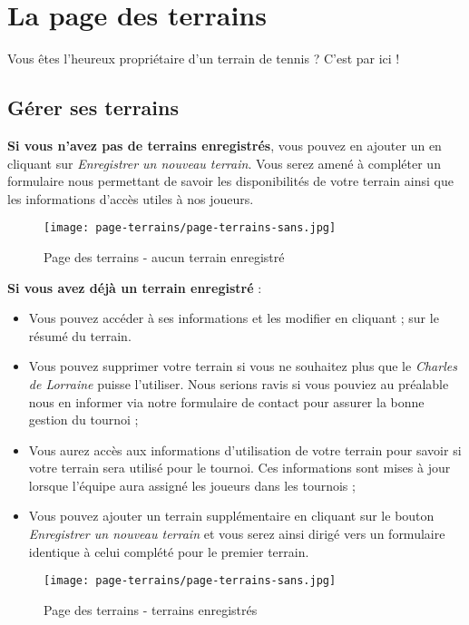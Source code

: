 \section{La page des terrains}

Vous êtes l'heureux propriétaire d'un terrain de tennis ? C'est par ici !

\subsection{Gérer ses terrains}

\textbf{Si vous n'avez pas de terrains enregistrés}, vous pouvez en ajouter un
en cliquant sur \textit{Enregistrer un nouveau terrain}. Vous serez amené à
compléter un formulaire nous permettant de savoir les disponibilités de votre
terrain ainsi que les informations d'accès utiles à nos joueurs.

\begin{figure}[H]
\centering
\texttt{[image: page-terrains/page-terrains-sans.jpg]}
\caption{Page des terrains - aucun terrain enregistré}
\end{figure}

\textbf{Si vous avez déjà un terrain enregistré} :

\begin{itemize}
    \item Vous pouvez accéder à ses informations et les modifier en cliquant ;
    sur le résumé du terrain.
    \item Vous pouvez supprimer votre terrain si vous ne souhaitez plus que
    le \textit{Charles de Lorraine} puisse l'utiliser. Nous serions ravis si vous
    pouviez au préalable nous en informer via notre formulaire de contact pour
    assurer la bonne gestion du tournoi ;
    \item Vous aurez accès aux informations d'utilisation de votre terrain pour
    savoir si votre terrain sera utilisé pour le tournoi. Ces informations
    sont mises à jour lorsque l'équipe aura assigné les joueurs dans les
    tournois ;
    \item Vous pouvez ajouter un terrain supplémentaire en cliquant sur le
    bouton \textit{Enregistrer un nouveau terrain} et vous serez ainsi dirigé
    vers un formulaire identique à celui complété pour le premier terrain.
\end{itemize}

\begin{figure}[H]
\centering
\texttt{[image: page-terrains/page-terrains-sans.jpg]}
\caption{Page des terrains - terrains enregistrés}
\end{figure}
